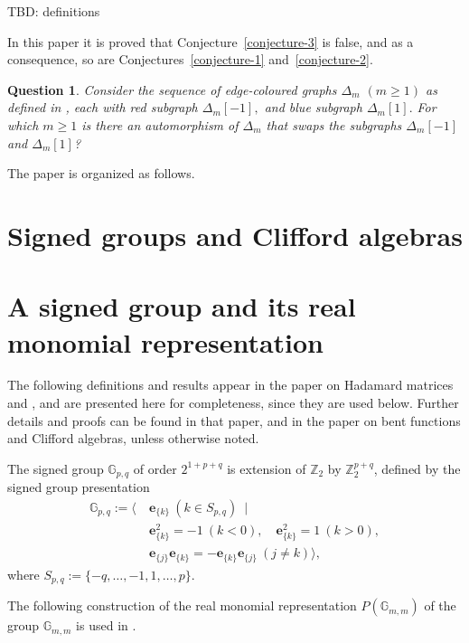 \documentclass[12pt,a4paper]{article}
\newcommand{\mb}[1]{\mathbb{#1}}
\newcommand{\mf}[1]{\mathbf{#1}}
\newcommand{\G}{\mb{G}}
\newcommand{\Z}{\mb{Z}}
\newcommand{\Rep}{P}
\newtheorem{Question}{Question}
\begin{document}
TBD: definitions

In this paper it is proved that Conjecture~\ref{conjecture-3} is false, and as a consequence, so are Conjectures~\ref{conjecture-1}
and~\ref{conjecture-2}.

\begin{Question}
\label{Question-1}
Consider the sequence of edge-coloured graphs $\varDelta_m$ $(m \geqslant 1)$ as defined in \cite{Leo14Constructions},
each with red subgraph $\varDelta_m[-1],$ and blue subgraph $\varDelta_m[1].$
For which $m \geqslant 1$ is there an automorphism of $\varDelta_m$ that swaps the subgraphs $\varDelta_m[-1]$ and $\varDelta_m[1]$?
\end{Question}
 


The paper is organized as follows.

\section{Signed groups and Clifford algebras}
\label{sec-A}

\section{A signed group and its real monomial representation}
\label{sec-first-bent}
%
The following definitions and results appear in the paper on Hada\-mard matrices and  \cite{Leo14Constructions},
and are presented here for completeness, since they are used below. 
Further details and proofs can be found in that paper, and in the paper on bent functions and Clifford algebras,
unless otherwise noted.

The signed group
$\G_{p,q}$ of order $2^{1+p+q}$ 
is extension of $\Z_2$ by $\Z_2^{p+q}$,
defined by the signed group presentation
%
\begin{align*}
\G_{p,q} := \bigg\langle \ 
&\mf{e}_{\{k\}}\ (k \in S_{p,q})\ \mid
\\
&\mf{e}_{\{k\}}^2 = -1\ (k < 0), \quad \mf{e}_{\{k\}}^2 = 1\ (k > 0),
\\
&\mf{e}_{\{j\}}\mf{e}_{\{k\}} = -\mf{e}_{\{k\}}\mf{e}_{\{j\}}\ (j \neq k) \bigg\rangle,
\end{align*}
%
where $S_{p,q} := \{-q,\ldots,-1,1,\ldots,p\}.$

The following construction of the real monomial representation $\Rep(\G_{m,m})$
of the group $\G_{m,m}$ is used in \cite{Leo14Constructions}.
\end{document}
